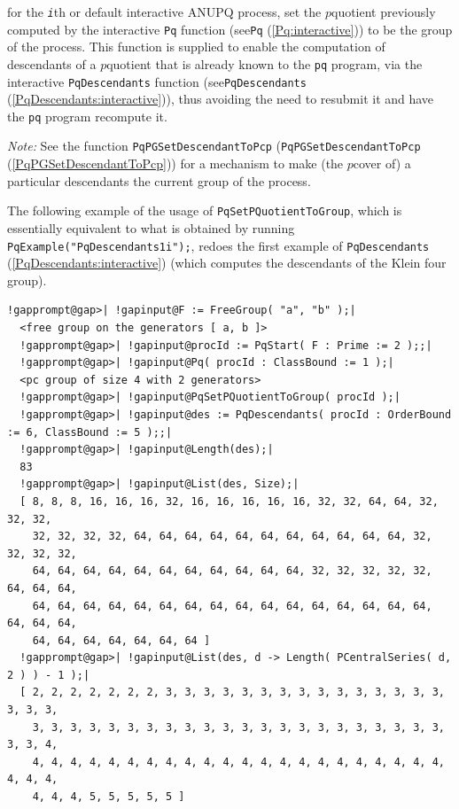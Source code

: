 \documentclass[a4paper,11pt]{report}
\begin{document}
{{{ for the \mbox{\texttt{\mdseries\slshape i}}th or default interactive \textsf{ANUPQ} process, set the $p$\texttt{}quotient previously computed by the interactive \texttt{Pq} function (see{\nobreakspace}\texttt{Pq} (\ref{Pq:interactive})) to be the group of the process. This function is supplied to enable the
computation of descendants of a $p$\texttt{}quotient that is already known to the \texttt{pq} program, via the interactive \texttt{PqDescendants} function (see{\nobreakspace}\texttt{PqDescendants} (\ref{PqDescendants:interactive})), thus avoiding the need to re\texttt{}submit it and have the \texttt{pq} program recompute it. 

 \emph{Note:} See the function \texttt{PqPGSetDescendantToPcp} (\texttt{PqPGSetDescendantToPcp} (\ref{PqPGSetDescendantToPcp})) for a mechanism to make (the $p$\texttt{}cover of) a particular descendants the current group of
the process. 

 The following example of the usage of \texttt{PqSetPQuotientToGroup}, which is essentially equivalent to what is obtained by running \texttt{PqExample("PqDescendants\texttt{}1\texttt{}i");}, redoes the first example of \texttt{PqDescendants} (\ref{PqDescendants:interactive}) (which computes the descendants of the Klein four group). 
\begin{Verbatim}[commandchars=!@|,fontsize=\small,frame=single,label=Example]
  !gapprompt@gap>| !gapinput@F := FreeGroup( "a", "b" );|
  <free group on the generators [ a, b ]>
  !gapprompt@gap>| !gapinput@procId := PqStart( F : Prime := 2 );;|
  !gapprompt@gap>| !gapinput@Pq( procId : ClassBound := 1 );|
  <pc group of size 4 with 2 generators>
  !gapprompt@gap>| !gapinput@PqSetPQuotientToGroup( procId );|
  !gapprompt@gap>| !gapinput@des := PqDescendants( procId : OrderBound := 6, ClassBound := 5 );;|
  !gapprompt@gap>| !gapinput@Length(des);|
  83
  !gapprompt@gap>| !gapinput@List(des, Size);|
  [ 8, 8, 8, 16, 16, 16, 32, 16, 16, 16, 16, 16, 32, 32, 64, 64, 32, 32, 32, 
    32, 32, 32, 32, 64, 64, 64, 64, 64, 64, 64, 64, 64, 64, 64, 32, 32, 32, 32, 
    64, 64, 64, 64, 64, 64, 64, 64, 64, 64, 64, 32, 32, 32, 32, 32, 64, 64, 64, 
    64, 64, 64, 64, 64, 64, 64, 64, 64, 64, 64, 64, 64, 64, 64, 64, 64, 64, 64, 
    64, 64, 64, 64, 64, 64, 64 ]
  !gapprompt@gap>| !gapinput@List(des, d -> Length( PCentralSeries( d, 2 ) ) - 1 );|
  [ 2, 2, 2, 2, 2, 2, 2, 3, 3, 3, 3, 3, 3, 3, 3, 3, 3, 3, 3, 3, 3, 3, 3, 3, 3, 
    3, 3, 3, 3, 3, 3, 3, 3, 3, 3, 3, 3, 3, 3, 3, 3, 3, 3, 3, 3, 3, 3, 3, 3, 4, 
    4, 4, 4, 4, 4, 4, 4, 4, 4, 4, 4, 4, 4, 4, 4, 4, 4, 4, 4, 4, 4, 4, 4, 4, 4, 
    4, 4, 4, 5, 5, 5, 5, 5 ]
\end{Verbatim}
 }

}}
\end{document}
